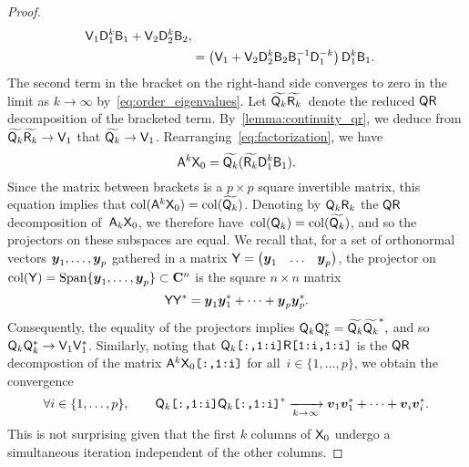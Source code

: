 \begin{proof}
\begin{align}
        \mathsf V_1 \mathsf D_1^k \mathsf B_1 + \mathsf V_2 \mathsf D_2^k \mathsf B_2, \\
        \label{eq:factorization}
        &= \left(\mathsf V_1  + \mathsf V_2 \mathsf D_2^{k} \mathsf B_2 \mathsf B_1^{-1}\mathsf D_1^{-k}\right) \mathsf D_1^k \mathsf B_1.
    \end{align}
    The second term in the bracket on the right-hand side converges to zero in the limit as $k \to \infty$ by~\eqref{eq:order_eigenvalues}.
    Let $\widetilde{\mathsf Q_k} \widetilde {\mathsf R_k}$~denote the reduced $\mathsf Q \mathsf R$ decomposition of the bracketed term.
    By~\cref{lemma:continuity_qr},
    we deduce from $\widetilde{\mathsf Q_k} \widetilde{\mathsf R_k} \to \mathsf V_1$ that $\widetilde{\mathsf Q_k} \to \mathsf V_1$.
    Rearranging~\eqref{eq:factorization},
    we have
    \[
        \mathsf A^k \mathsf X_0 = \widetilde{\mathsf Q_k} (\widetilde{\mathsf R_k} \mathsf D_1^k \mathsf B_1).
    \]
    Since the matrix between brackets is a $p \times p$ square invertible matrix,
    this equation implies that $\operatorname{col}(\mathsf A^k \mathsf X_0) = \operatorname{col} (\widetilde{\mathsf Q_k})$.
    Denoting by $\mathsf Q_k \mathsf R_k$ the $\mathsf Q \mathsf R$ decomposition of~$\mathsf A_k \mathsf X_0$,
    we therefore have~$\operatorname{col}(\mathsf Q_k) = \operatorname{col}(\widetilde {\mathsf Q_k})$,
    and so the projectors on these subspaces are equal.
    We recall that, for a set of orthonormal vectors $\mathbf{\boldsymbol{y}}_1, \dotsc, \mathbf{\boldsymbol{y}}_p$
    gathered in a matrix $\mathsf Y = \begin{pmatrix} \mathbf{\boldsymbol{y}}_1 & \hdots & \mathbf{\boldsymbol{y}}_p \end{pmatrix}$,
    the projector on $\operatorname{col}(\mathsf Y) = \operatorname{Span} \{\mathbf{\boldsymbol{y}}_1, \dotsc, \mathbf{\boldsymbol{y}}_p \} \subset \mathbf C^n$
    is the square $n \times n$ matrix
    \[
        \mathsf Y \mathsf Y^*
        = \mathbf{\boldsymbol{y}}_1 \mathbf{\boldsymbol{y}}_1^* + \dotsb + \mathbf{\boldsymbol{y}}_p \mathbf{\boldsymbol{y}}_p^*.
    \]
    Consequently,
    the equality of the projectors implies
    \(
        \mathsf Q_k \mathsf Q_k^* = \widetilde{\mathsf Q_k} \widetilde {\mathsf Q_k}^*,
    \)
    and so $\mathsf Q_k \mathsf Q_k^* \to \mathsf V_1 \mathsf V_1^*$.
    Similarly, noting that $\mathsf Q_k\texttt{[:,1:i]} \mathsf R\texttt{[1:i,1:i]}$ is the $\mathsf Q \mathsf R$ decompostion of the matrix $\mathsf A^k \mathsf X_0\texttt{[:,1:i]}$ for all~$i \in \{1, \dotsc, p\}$,
    we obtain the convergence
    \begin{equation}
        \label{eq:convergence_projectors}
        \forall i \in \{1, \dotsc, p\}, \qquad
        \mathsf Q_k\texttt{[:,1:i]} \mathsf Q_k\texttt{[:,1:i]}^* \xrightarrow[k\to \infty]{} \mathbf{\boldsymbol{v}}_1 \mathbf{\boldsymbol{v}}_1^* + \dotsb + \mathbf{\boldsymbol{v}}_{i} \mathbf{\boldsymbol{v}}_{i}^*.
    \end{equation}
    This is not surprising given that the first $k$ columns of $\mathsf X_0$ undergo a simultaneous iteration independent of the other columns.


\end{proof}
